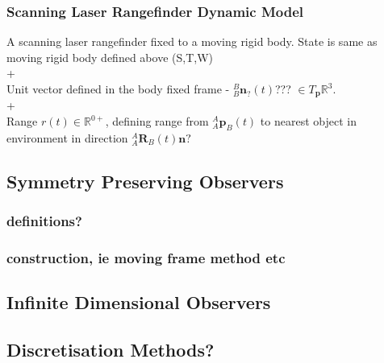 	\subsubsection{Scanning Laser Rangefinder Dynamic Model}
		A scanning laser rangefinder fixed to a moving rigid body. State is same as moving rigid body defined above (S,T,W)\\+\\
		Unit vector defined in the body fixed frame  - ${^{B}_{B}\mathbf{n}^{}_{?}(t)}$??? $\in T_\mathbf{p}\mathbb{R}^3$.\\+\\
		Range $r(t) \in \mathbb{R}^{0+}$, defining range from $^{A}_{A}\mathbf{p}^{}_{B}(t)$ to nearest object in environment in direction $^{A}_{A}\mathbf{R}^{}_{B}(t)\mathbf{n?}$
		

\subsection{Symmetry Preserving Observers}
	\subsubsection{definitions?}
	\subsubsection{construction, ie moving frame method etc}
\subsection{Infinite Dimensional Observers}
\subsection{Discretisation Methods?}